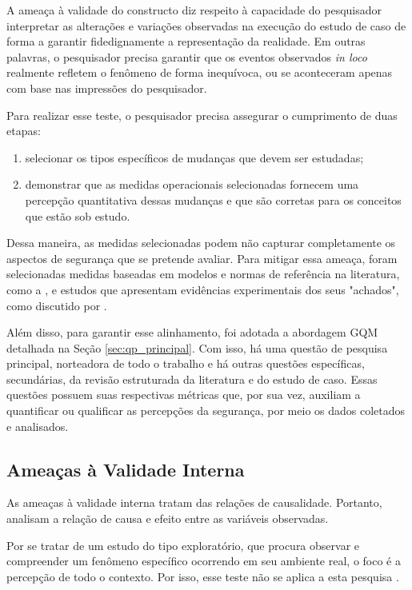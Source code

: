 A ameaça à validade do constructo diz respeito à capacidade do pesquisador interpretar as alterações e variações observadas na execução do estudo de caso de forma a garantir fidedignamente a representação da realidade. Em outras palavras, o pesquisador precisa garantir que os eventos observados \textit{in loco} realmente refletem o fenômeno de forma inequívoca, ou se aconteceram apenas com base nas impressões do pesquisador.

Para realizar esse teste, o pesquisador precisa assegurar o cumprimento de duas etapas:

\begin{enumerate}
  \item selecionar os tipos específicos de mudanças que devem ser estudadas;
  \item demonstrar que as medidas operacionais selecionadas fornecem uma percepção quantitativa dessas mudanças e que são corretas para os conceitos que estão sob estudo.
\end{enumerate}


Dessa maneira, as medidas selecionadas podem não capturar completamente os aspectos de segurança que se pretende avaliar. Para mitigar essa ameaça, foram selecionadas medidas baseadas em modelos e normas de referência na literatura, como a , e estudos que apresentam evidências experimentais dos seus "achados", como discutido por .

Além disso, para garantir esse alinhamento, foi adotada a abordagem GQM detalhada na Seção \ref{sec:qp_principal}. Com isso, há uma questão de pesquisa principal, norteadora de todo o trabalho e há outras questões específicas, secundárias, da revisão estruturada da literatura e do estudo de caso. Essas questões possuem suas respectivas métricas que, por sua vez, auxiliam a quantificar ou qualificar as percepções da segurança, por meio os dados coletados e analisados.

\subsection{Ameaças à Validade Interna}

As ameaças à validade interna tratam das relações de causalidade. Portanto, analisam a relação de causa e efeito entre as variáveis observadas.

Por se tratar de um estudo do tipo exploratório, que procura observar e compreender um fenômeno específico ocorrendo em seu ambiente real, o foco é a percepção de todo o contexto. Por isso, esse teste não se aplica a esta pesquisa \cite{yin2015estudo}. 

